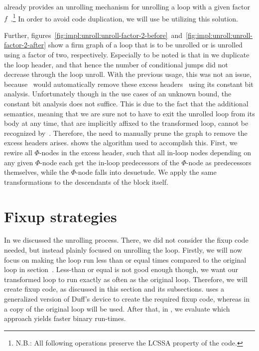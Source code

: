 \libFIRM{} already provides an unrolling mechanism for unrolling a loop with a given factor $f$~\cite{aebi18bachelorarbeit}.\footnote{N.B.: All following operations preserve the LCSSA property of the code.}
In order to avoid code duplication, we will use be utilizing this solution.

Further, figures~\ref{fig:impl:unroll:unroll-factor-2-before}~and~\ref{fig:impl:unroll:unroll-factor-2-after} show a firm graph of a loop that is to be unrolled or is unrolled using a factor of two, respectively.
Especially to be noted is that in  we duplicate the loop header, and that hence the number of conditional jumps did not decrease through the loop unroll.
With the previous usage, this was not an issue, because~\libFIRM{} would automatically remove these excess headers~\cite{aebi18bachelorarbeit} using its constant bit analysis.
Unfortunately though in the use cases of an unknown bound, the constant bit analysis does not suffice.
This is due to the fact that the additional semantics, meaning that we are sure not to have to exit the unrolled loop from its body at any time, that are implicitly affixed to the transformed loop, cannot be recognized by~\libFIRM.
Therefore, the need to manually prune the graph to remove the excess headers arises.
 shows the algorithm used to accomplish this.
First, we rewire all $\Phi$-nodes in the excess header, such that all in-loop nodes depending on any given $\Phi$-node each get the in-loop predecessors of the $\Phi$-node as predecessors themselves, while the $\Phi$-node falls into desuetude.
We apply the same transformations to the descendants of the block itself.







\newpage

\section{Fixup strategies}\label{sec:impl:fixup}

In  we discussed the unrolling process.
There, we did not consider the fixup code needed, but instead plainly focused on unrolling the loop.
Firstly, we will now focus on making the loop run less than or equal times compared to the original loop in section~.
Less-than or equal is not good enough though, we want our transformed loop to run exactly as often as the original loop.
Therefore, we will create fixup code, as discussed in this section and its subsections.
 uses a generalized version of Duff's device to create the required fixup code, whereas in  a copy of the original loop will be used.
After that, in , we evaluate which approach yields faster binary run-times.

